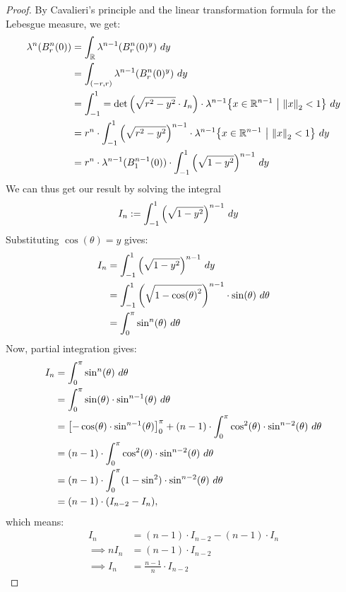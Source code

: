 \begin{proof}
	By Cavalieri's principle and the linear transformation formula for the Lebesgue measure, we get:
	\begin{align*}
		\lambda^n(B^n_r(0))
		&=
		\int_{\mathbb{R}} \lambda^{n-1}\qty(B^n_r(0)^y) ~dy\\
		&=
		\int_{(-r,r)} \lambda^{n-1}\qty(B^n_r(0)^y) ~dy\\
		&=
		\int_{-1}^1 = \det\qty(\sqrt{r^2-y^2} \cdot I_n) \cdot \lambda^{n-1}\qty{x \in \mathbb{R}^{n-1} ~\middle|~\norm{x}_2 < 1} ~dy\\
		&=
		r^n \cdot \int_{-1}^1 \qty(\sqrt{r^2-y^2})^{n-1} \cdot \lambda^{n-1} \qty{x \in \mathbb{R}^{n-1} ~\middle|~\norm{x}_2 < 1} ~dy\\
		&=
		r^n \cdot \lambda^{n-1}(B^{n-1}_1(0)) \cdot \int_{-1}^1 \qty(\sqrt{1 - y^2})^{n-1} ~dy
	\end{align*}
	We can thus get our result by solving the integral
	\begin{align*}
		I_n &:= \int_{-1}^1 \qty(\sqrt{1-y^2})^{n-1} ~dy
	\end{align*}
	Substituting $\cos(\theta) = y$ gives:
	\begin{align*}
		I_n &= \int_{-1}^1 \qty(\sqrt{1-y^2})^{n-1} ~dy\\
		&= \int_{-1}^1 \qty(\sqrt{1-\cos(\theta)^2})^{n-1} \cdot \sin(\theta) ~d\theta\\
		&= \int_{0}^\pi \sin^n(\theta) ~d\theta
	\end{align*}
	Now, partial integration gives:
	\begin{align*}
		I_n 
		&= \int_{0}^\pi \sin^n(\theta) ~d\theta\\
		&= \int_{0}^\pi \sin(\theta) \cdot \sin^{n-1}(\theta) ~d\theta\\
		&=
		\qty[-\cos(\theta) \cdot \sin^{n-1}(\theta)]_0^\pi + (n-1) \cdot \int_{0}^\pi \cos^2(\theta) \cdot \sin^{n-2}(\theta) ~d\theta\\
		&=
		(n-1) \cdot \int_{0}^\pi \cos^2(\theta) \cdot \sin^{n-2}(\theta) ~d\theta\\
		&=
		(n-1) \cdot \int_{0}^\pi (1 - \sin^2) \cdot \sin^{n-2}(\theta) ~d\theta\\
		&=
		(n-1) \cdot (I_{n-2} - I_n),
	\end{align*}
	which means:
	\begin{align*}
		I_n &= (n-1) \cdot I_{n-2} - (n-1) \cdot I_n\\
		\implies n I_n &= (n-1) \cdot I_{n-2}\\
		\implies I_n &= \frac{n-1}{n} \cdot I_{n-2}
	\end{align*}

\end{proof}
